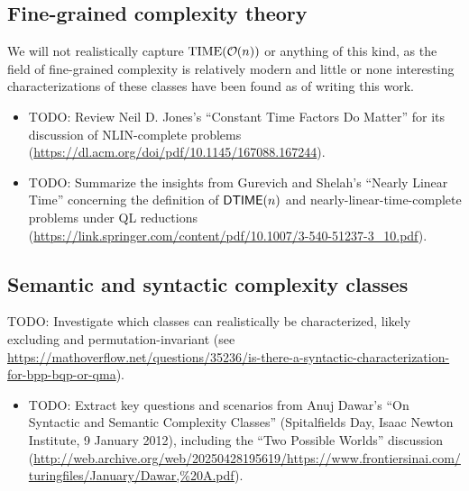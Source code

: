 \subsection{Fine-grained complexity theory}
We will not realistically capture $\text{TIME}(\bigO(n))$ or anything of this kind,
as the field of fine-grained complexity is relatively modern and little or none interesting
characterizations of these classes have been found as of writing this work.
\begin{itemize}
\item TODO: Review Neil D. Jones's ``Constant Time Factors Do Matter'' for its discussion of NLIN-complete problems (\url{https://dl.acm.org/doi/pdf/10.1145/167088.167244}).
\item TODO: Summarize the insights from Gurevich and Shelah's ``Nearly Linear Time'' concerning the definition of $\mathsf{DTIME}(n)$ and nearly-linear-time-complete problems under QL reductions (\url{https://link.springer.com/content/pdf/10.1007/3-540-51237-3_10.pdf}).
\end{itemize}

\subsection{Semantic and syntactic complexity classes}
TODO: Investigate which classes can realistically be characterized, likely excluding  and permutation-invariant  (see \url{https://mathoverflow.net/questions/35236/is-there-a-syntactic-characterization-for-bpp-bqp-or-qma}).
\begin{itemize}

\item TODO: Extract key questions and scenarios from Anuj Dawar's ``On Syntactic and Semantic Complexity Classes'' (Spitalfields Day, Isaac Newton Institute, 9 January 2012), including the ``Two Possible Worlds'' discussion (\url{http://web.archive.org/web/20250428195619/https://www.frontiersinai.com/turingfiles/January/Dawar,%20A.pdf}).

\end{itemize}

